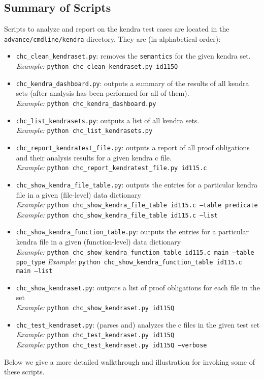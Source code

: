 \documentclass[11pt]{article}
\begin{document}
\subsection{Summary of Scripts}
Scripts to analyze and report on the kendra test cases are located in the 
{\tt advance/cmdline/kendra} directory. They are (in alphabetical
order):
\begin{itemize}
\item {\tt chc\_clean\_kendraset.py}: removes the {\tt semantics} for the given
  kendra set. \\
  \emph{Example:} {\tt python chc\_clean\_kendraset.py id115Q}
\item {\tt chc\_kendra\_dashboard.py}: outputs a summary of the results of all
  kendra sets (after analysis has been performed for all of them). \\
  \emph{Example:} {\tt python chc\_kendra\_dashboard.py}
\item {\tt chc\_list\_kendrasets.py}: outputs a list of all kendra sets.\\
  \emph{Example:} {\tt python chc\_list\_kendrasets.py}
\item {\tt chc\_report\_kendratest\_file.py}: outputs a report of all proof obligations
   and their analysis results for a given kendra c file. \\
   \emph{Example:} {\tt python chc\_report\_kendratest\_file.py id115.c}
\item {\tt chc\_show\_kendra\_file\_table.py}: outputs the entries for a particular
   kendra file in a given (file-level) data dictionary \\
   \emph{Example:} {\tt python chc\_show\_kendra\_file\_table id115.c --table predicate} \\
   \emph{Example:} {\tt python chc\_show\_kendra\_file\_table id115.c --list}
\item {\tt chc\_show\_kendra\_function\_table.py}: outputs the entries for a particular
   kendra file in a given (function-level) data dictionary \\
   \emph{Example:} {\tt python chc\_show\_kendra\_function\_table id115.c main --table 
     ppo\_type}
   \emph{Example:} {\tt python chc\_show\_kendra\_function\_table id115.c main --list}
\item {\tt chc\_show\_kendraset.py}: outputs a list of proof obligations for each file
    in the set \\
    \emph{Example:} {\tt python chc\_show\_kendraset.py id115Q}
\item {\tt chc\_test\_kendraset.py}: (parses and) analyzes the c files in the given test
    set \\
    \emph{Example:} {\tt python chc\_test\_kendraset.py id115Q} \\
    \emph{Example:} {\tt python chc\_test\_kendraset.py id115Q --verbose}
\end{itemize}
Below we give a more detailed walkthrough and illustration for invoking some of these scripts.
\end{document}
